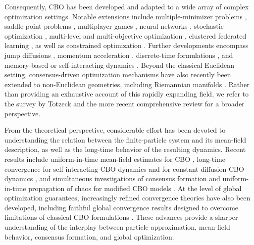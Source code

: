 \documentclass[12pt]{amsart}
\numberwithin{equation}{section}
\begin{document}
Consequently, CBO has been developed and adapted to a wide array of complex optimization settings. Notable extensions include multiple-minimizer problems \cite{bungert2025polarized,fornasier2025pde,huang2025faithful}, saddle point problems \cite{huang2024consensus,borghi2024particle}, multiplayer games \cite{chenchene2025consensus}, neural networks \cite{de2025mean}, stochastic optimization \cite{bellavia2025discrete,bonandin2025consensus}, multi-level \cite{herty2025multiscale,garcia2025defending} and multi-objective optimization \cite{borghi2023adaptive,kang2026time}, clustered federated learning \cite{carrillo2023fedcbo}, as well as constrained optimization \cite{bungert2025mirrorcbo,beddrich2026constrained,borghi2023constrained}. Further developments encompass jump diffusions \cite{kalise2023consensus,aceves2026consensus}, momentum acceleration \cite{chen2022consensus}, discrete-time formulations \cite{ha2020convergence,ha2021convergence,ko2022convergence}, and memory-based or self-interacting dynamics \cite{riedl2024leveraging,huang2024self,totzeck2020consensus}. Beyond the classical Euclidean setting, consensus-driven optimization mechanisms have also recently been extended to non-Euclidean geometries, including Riemannian manifolds \cite{huang2026collective}. Rather than providing an exhaustive account of this rapidly expanding field, we refer to the survey by Totzeck \cite{totzeck2021trends} and the more recent comprehensive review \cite{fornasier2026consensus} for a broader perspective.

From the theoretical perspective, considerable effort has been devoted to understanding the relation between the finite-particle system and its mean-field description, as well as the long-time behavior of the resulting dynamics. Recent results include uniform-in-time mean-field estimates for CBO \cite{huang2025uniform,bayraktar2026uniform,gerber2025uniform}, long-time convergence for self-interacting CBO dynamics \cite{huang2024self} and for constant-diffusion CBO dynamics \cite{bianchi2025consensus}, and simultaneous investigations of consensus formation and uniform-in-time propagation of chaos for modified CBO models \cite{choi2025modified}. At the level of global optimization guarantees, increasingly refined convergence theories have also been developed, including faithful global convergence results designed to overcome limitations of classical CBO formulations \cite{huang2025faithful}. These advances provide a sharper understanding of the interplay between particle approximation, mean-field behavior, consensus formation, and global optimization.
\end{document}
